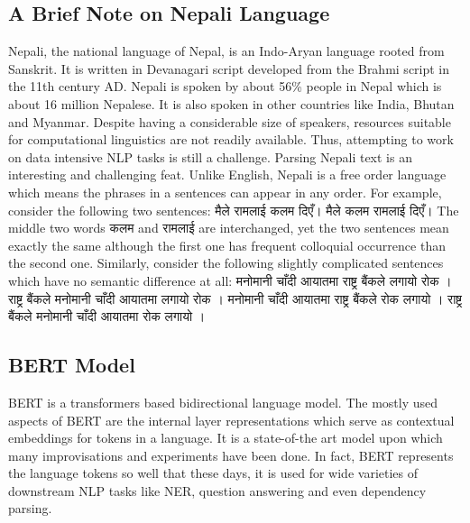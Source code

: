 \subsection{A Brief Note on Nepali Language}
Nepali, the national language of Nepal, is an Indo-Aryan language rooted from
Sanskrit. It is written in Devanagari script developed from  the  Brahmi
script in the 11th century AD. Nepali is spoken by about 56\% people in Nepal
which is about 16 million Nepalese. It is also spoken in other countries like
India, Bhutan and Myanmar. Despite having a considerable size of speakers,
resources suitable for computational linguistics are not readily available.
Thus, attempting to work on data intensive NLP tasks is still a challenge.
\newline
\newline
Parsing Nepali text is an interesting and challenging feat. Unlike English,
Nepali is a free order language which means the phrases in a sentences can
appear in any order. For example, consider the following two sentences:
\newline
\newline
{\dev
मैले रामलाई कलम दिएँ।
\newline
मैले कलम रामलाई दिएँ।
}
\newline
\newline
The middle two words {\dev कलम }and {\dev रामलाई} are interchanged, yet the two
sentences mean exactly the same although the first one has frequent colloquial
occurrence than the second one. Similarly, consider the following slightly
complicated sentences which have no semantic difference at all:
\newline
\newline
{\dev
मनोमानी चाँदी आयातमा राष्ट्र बैंकले लगायो रोक ।
\newline
राष्ट्र बैंकले मनोमानी चाँदी आयातमा लगायो रोक ।
\newline
मनोमानी चाँदी आयातमा राष्ट्र बैंकले रोक लगायो ।
\newline
राष्ट्र बैंकले मनोमानी चाँदी आयातमा रोक लगायो ।
}

\subsection*{BERT Model}
BERT is a transformers based bidirectional language model. The mostly used
aspects of BERT are the internal layer representations which serve as
contextual embeddings for tokens in a language. It is a state-of-the art model
upon which many improvisations and experiments have been done. In fact, BERT
represents the language tokens so well that these days, it is used for wide
varieties of downstream NLP tasks like NER, question answering and even
dependency parsing.

